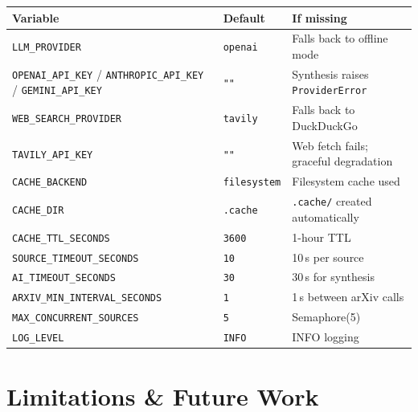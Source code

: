 \documentclass[11pt,a4paper]{article}
\begin{document}
\begin{center}\small
\begin{tabular}{lll}
\toprule
\textbf{Variable} & \textbf{Default} & \textbf{If missing} \\
\midrule
\texttt{LLM\_PROVIDER} & \texttt{openai} & Falls back to offline mode \\
\texttt{OPENAI\_API\_KEY} / \texttt{ANTHROPIC\_API\_KEY} / \texttt{GEMINI\_API\_KEY} & \texttt{""} & Synthesis raises \texttt{ProviderError} \\
\texttt{WEB\_SEARCH\_PROVIDER} & \texttt{tavily} & Falls back to DuckDuckGo \\
\texttt{TAVILY\_API\_KEY} & \texttt{""} & Web fetch fails; graceful degradation \\
\texttt{CACHE\_BACKEND} & \texttt{filesystem} & Filesystem cache used \\
\texttt{CACHE\_DIR} & \texttt{.cache} & \texttt{.cache/} created automatically \\
\texttt{CACHE\_TTL\_SECONDS} & \texttt{3600} & 1-hour TTL \\
\texttt{SOURCE\_TIMEOUT\_SECONDS} & \texttt{10} & 10\,s per source \\
\texttt{AI\_TIMEOUT\_SECONDS} & \texttt{30} & 30\,s for synthesis \\
\texttt{ARXIV\_MIN\_INTERVAL\_SECONDS} & \texttt{1} & 1\,s between arXiv calls \\
\texttt{MAX\_CONCURRENT\_SOURCES} & \texttt{5} & Semaphore(5) \\
\texttt{LOG\_LEVEL} & \texttt{INFO} & INFO logging \\
\bottomrule
\end{tabular}
\end{center}

\section{Limitations \& Future Work}\label{sec:limits}
\end{document}
